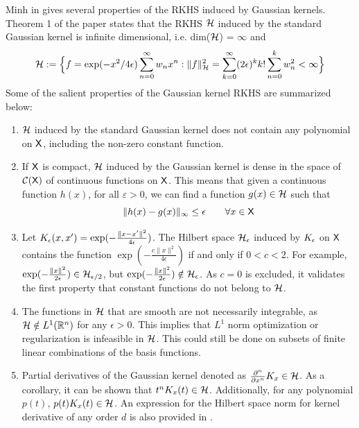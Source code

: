 Minh in \cite{min10} gives several properties of the RKHS induced by Gaussian kernels. Theorem 1 of the paper states that the RKHS ${\cal H}$ induced by the standard Gaussian kernel is infinite dimensional, i.e. dim(${\cal H}$) = $\infty$ and 
\begin{equation}
{\cal H} := \Bigl\{ f = \exp(-x^2/4\epsilon) \sum_{n=0}^\infty w_n x^n: \|f\|^2_{\cal H} = \sum_{k=0}^\infty (2\epsilon)^k k! \sum_{n=0}^k w_n^2 <\infty \Bigr\}
\end{equation}
Some of the salient properties of the Gaussian kernel RKHS are summarized below: 
\begin{enumerate}
	\item ${\cal H}$ induced by the standard Gaussian kernel does not contain any polynomial on ${\sf X}$, including the non-zero constant function. 
	
	\item If ${\sf X}$ is compact, ${\cal H}$ induced by the Gaussian kernel is dense in the space of $\mathcal{C}({\sf X})$ of continuous functions on ${\sf X}$.
	This means that given a continuous function $h(x)$, for all $\varepsilon >0$, we can find a function $g(x) \in {\cal H}$ such that 
	\begin{equation}
	\|h(x) - g(x)\|_\infty \leq \epsilon \qquad \forall x \in {\sf X}
	\end{equation} 
	\item Let $K_{\epsilon}(x,x') = \exp(-\frac{\|x-x'\|^2}{4\epsilon})$. The Hilbert space ${\cal H}_\epsilon$ induced by $K_\epsilon$ on ${\sf X}$ contains the function $\exp(-\frac{c \|x\|^2} {4 \epsilon})$ if and only if $0<c <2$. For example, $\exp(-\frac{\|x\|^2}{2 \epsilon}) \in {\cal H}_{\epsilon/2}$, but  $\exp(-\frac{\|x\|^2}{2 \epsilon}) \notin {\cal H}_{\epsilon}$. As $c=0$ is excluded, it validates the first property that constant functions do not belong to ${\cal H}$.
	
	\item The functions in ${\cal H}$ that are smooth are not necessarily integrable, as ${\cal H} \notin L^1(\mathbb{R}^n)$ for any $\epsilon >0$.  This implies that $L^1$ norm optimization or regularization is infeasible in ${\cal H}$. This could still be done on subsets of finite linear combinations of the basis functions.
	

\item Partial derivatives of the Gaussian kernel denoted as $\frac{\partial^n}{\partial x^n} K_x \in {\cal H}$. As a corollary, it can be shown that $t^n K_x(t)\in{\cal H}$. Additionally, for any polynomial $p(t)$, $p(t) K_x(t) \in {\cal H}$. An expression for the Hilbert space norm for kernel derivative of any order $d$ is also provided in \cite{min10}. 
\end{enumerate}

